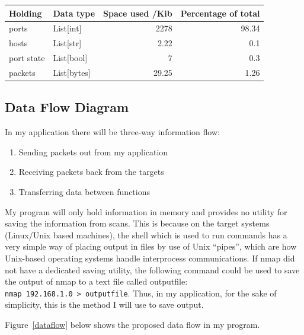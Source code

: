 \documentclass[titlepage]{article}
\let\Oldsubsection\subsection{}
\renewcommand{\subsection}{\FloatBarrier\Oldsubsection}
\begin{document}
\begin{center}
  \begin{tabular}{p{3cm} l r r}
    \toprule
    Holding    & Data type   & Space used /Kib & Percentage of total \\
    \midrule
    ports      & List[int]   & 2278            & 98.34 \\
    hosts      & List[str]   & 2.22            & 0.1   \\
    port state & List[bool]  & 7               & 0.3   \\
    packets    & List[bytes] & 29.25           & 1.26  \\
    \bottomrule
  \end{tabular}
\end{center}

\subsection{Data Flow Diagram}

In my application there will be three-way information flow: 
\begin{enumerate}
  \item{Sending packets out from my application}
  \item{Receiving packets back from the targets}
  \item{Transferring data between functions}
\end{enumerate}
My program will only hold information in memory and provides no utility
for saving the information from scans. This is because on the target systems
(Linux/Unix based machines), the shell which is used to run commands has
a very simple way of placing output in files by use of
Unix ``pipes'', which are how Unix-based operating systems handle interprocess
communications. 
If nmap did not have a dedicated saving utility, the following command could 
be used to save the output of nmap to a text file called outputfile: \\
\verb|nmap 192.168.1.0 > outputfile|. Thus, in my application, for the sake of
simplicity, this is the method I will use to save output.

Figure~\ref{dataflow} below shows the proposed data flow in my program.
\end{document}
